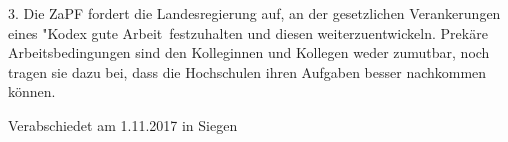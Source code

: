 \documentclass[DIV=calc]{scrartcl}
\begin{document}
3. Die ZaPF fordert die Landesregierung auf, an der gesetzlichen Verankerungen eines "Kodex  gute Arbeit\grqq ~festzuhalten und diesen weiterzuentwickeln.
Prekäre Arbeitsbedingungen sind den Kolleginnen und Kollegen weder zumutbar, noch tragen sie dazu bei, dass die Hochschulen ihren Aufgaben besser nachkommen können.
\vspace{-0.5\baselineskip}
    \begin{flushright}
        Verabschiedet am 1.11.2017 in Siegen
    \end{flushright}
\end{document}
